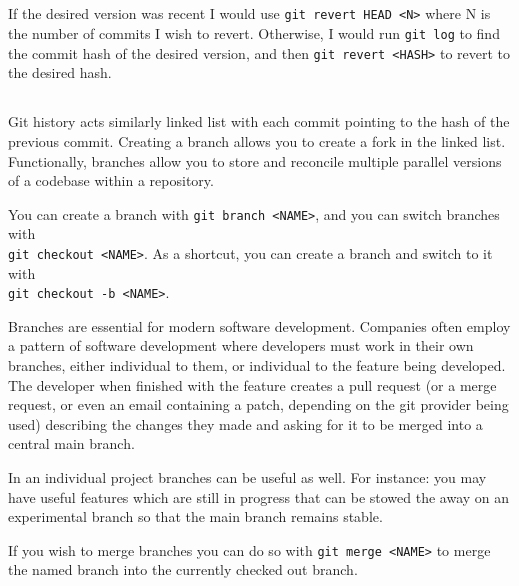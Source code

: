 \documentclass{article}
\begin{document}
\subsection{}
If the desired version was recent I would use \texttt{git revert HEAD~<N>} where N is the number of commits I wish to revert. Otherwise, I would run \texttt{git log} to find the commit hash of the desired version, and then \texttt{git revert <HASH>} to revert to the desired hash.
\subsection{}
Git history acts similarly linked list with each commit pointing to the hash of the previous commit. Creating a branch allows you to create a fork in the linked list. Functionally, branches allow you to store and reconcile multiple parallel versions of a codebase within a repository.

You can create a branch with \texttt{git branch <NAME>}, and you can switch branches with \\ \texttt{git checkout <NAME>}. As a shortcut, you can create a branch and switch to it with \\ \texttt{git checkout -b <NAME>}.

Branches are essential for modern software development. Companies often employ a pattern of software development where developers must work in their own branches, either individual to them, or individual to the feature being developed. The developer when finished with the feature creates a pull request (or a merge request, or even an email containing a patch, depending on the git provider being used) describing the changes they made and asking for it to be merged into a central main branch.

In an individual project branches can be useful as well. For instance: you may have useful features which are still in progress that can be stowed the away on an experimental branch so that the main branch remains stable.

If you wish to merge branches you can do so with \texttt{git merge <NAME>} to merge the named branch into the currently checked out branch.
\newpage

\section{}
\end{document}
